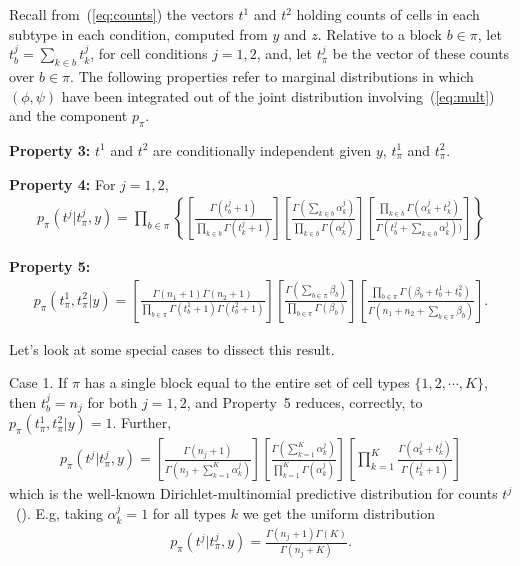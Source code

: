 \documentclass[aoas,preprint]{imsart}
\begin{document}
Recall from~(\ref{eq:counts}) the vectors $t^1$ and $t^2$ holding
counts  of cells in each subtype in each condition, computed from $y$ and $z$.  Relative to a block $b \in \pi$, 
let $t^j_b = \sum_{k\in b} t^j_k$, for cell conditions $j=1,2$, and,
let $t^j_\pi$ be the vector of these counts over $b \in \pi$.   The following properties refer to
marginal distributions in which $(\phi,\psi)$ have been integrated out of the joint
distribution involving~(\ref{eq:mult}) and the component $p_\pi$.

\noindent
{\bf Property 3:}  $t^1$ and $t^2$ are conditionally independent given $y$, $t^1_\pi$ and $t^2_\pi$.

\noindent
{\bf Property 4:}  For $j=1,2$,
\begin{eqnarray*}
p_\pi(t^j | t^j_{\pi},y) = \prod_{b \in \pi} \left\{
\left[ \frac{ \Gamma(t^j_b +1 ) }{\prod_{k \in b} \Gamma( t^j_k + 1 ) } 
\right]
\left[ \frac{\Gamma( \sum_{k \in b} \alpha_k^j )}{
		\prod_{k\in b} \Gamma( \alpha_k^j ) } \right] 
       \left[        \frac{ \prod_{k \in b} \Gamma(\alpha_k^j + t^j_k)  }{
		\Gamma(t^j_b + \sum_{k\in b} \alpha_k^j ) )}\right]
 \right\}
\end{eqnarray*}

\noindent
{\bf Property 5:}  
\begin{eqnarray*}
p_\pi(t^1_{\pi},t^2_{\pi}| y) =
 \left[ \frac{ \Gamma(n_1+1) \Gamma(n_2+1) }{ \prod_{b \in \pi} \Gamma(t^1_b+1) 
   \Gamma( t^2_b + 1 )} \right] 
\left[ \frac{\Gamma( \sum_{b \in \pi} \beta_b  )}{
   \prod_{b \in \pi} \Gamma(\beta_b )} \right] 
 \left[ \frac{ \prod_{b \in \pi} \Gamma( \beta_b + t^1_b + t^2_b )}{
	\Gamma( n_1 + n_2 + \sum_{b \in \pi} \beta_b  )} \right].
\end{eqnarray*}


Let's look at some special cases to dissect this result. 

Case 1. If $\pi$ has a single block equal to the entire
 set of cell types $\{1,2, \cdots, K\}$,  then $t^j_b=n_j$ for both $j=1,2$,
and Property~5 reduces, correctly, to 
$p_\pi(t^1_{\pi},t^2_{\pi}| y) = 1$.  Further,
\begin{eqnarray*}
p_\pi(t^j | t^j_{\pi},y) = 
\left[ \frac{ \Gamma(n_j +1 ) }{ \Gamma( n_j + \sum_{k=1}^K \alpha_k^j ) }
\right]
\left[ \frac{\Gamma( \sum_{k =1}^K \alpha_k^j )}{
                \prod_{k=1}^K \Gamma( \alpha_k^j ) } \right]
       \left[    \prod_{k=1}^K    \frac{  \Gamma(\alpha_k^j + t^j_k)}{
                \Gamma(t^j_k + 1 )}\right]
\end{eqnarray*}
which is the well-known Dirichlet-multinomial predictive distribution
for counts $t^j$~(\cite{Wag}).  E.g, taking $\alpha_k^j=1$ for all types $k$ 
we get the uniform distribution
\begin{eqnarray*}
p_\pi(t^j | t^j_{\pi},y) = 
 \frac{ \Gamma(n_j +1 ) \Gamma(K) }{ \Gamma( n_j + K ) }.
\end{eqnarray*}
\end{document}
